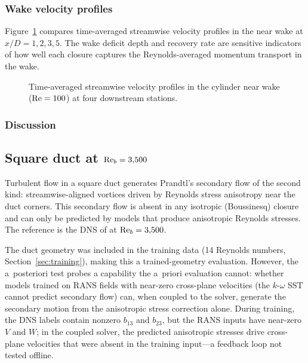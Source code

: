 \subsubsection{Wake velocity profiles}

Figure~\ref{fig:cyl_wake} compares time-averaged streamwise velocity profiles in the near wake at $x/D = 1, 2, 3, 5$.
The wake deficit depth and recovery rate are sensitive indicators of how well each closure captures the Reynolds-averaged momentum transport in the wake.

\begin{figure}[htbp]
\centering
{}
\caption{Time-averaged streamwise velocity profiles in the cylinder near wake ($\mathrm{Re} = 100$) at four downstream stations.}
\label{fig:cyl_wake}
\end{figure}

\subsubsection{Discussion}


\subsection{Square duct at $\mathrm{Re}_b = 3{,}500$}
\label{sec:aposteriori:duct}

Turbulent flow in a square duct generates Prandtl's secondary flow of the second kind: streamwise-aligned vortices driven by Reynolds stress anisotropy near the duct corners.
This secondary flow is absent in any isotropic (Boussinesq) closure and can only be predicted by models that produce anisotropic Reynolds stresses.
The reference is the DNS of \citet{Pinelli2010} at $\mathrm{Re}_b = 3{,}500$.

The duct geometry was included in the training data (14 Reynolds numbers, Section~\ref{sec:training}), making this a trained-geometry evaluation.
However, the a~posteriori test probes a capability the a~priori evaluation cannot: whether models trained on RANS fields with near-zero cross-plane velocities (the $k$-$\omega$ SST cannot predict secondary flow) can, when coupled to the solver, generate the secondary motion from the anisotropic stress correction alone.
During training, the DNS labels contain nonzero $b_{13}$ and $b_{23}$, but the RANS inputs have near-zero $V$ and $W$; in the coupled solver, the predicted anisotropic stresses drive cross-plane velocities that were absent in the training input---a feedback loop not tested offline.


